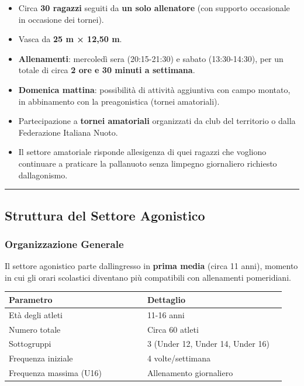 \documentclass[a4paper,11pt]{article}
\providecommand{\tightlist}{%
  \setlength{\itemsep}{0pt}\setlength{\parskip}{0pt}}
\begin{document}
\begin{itemize}
      \tightlist
      \item
            Circa \textbf{30 ragazzi} seguiti da \textbf{un solo allenatore} (con
            supporto occasionale in occasione dei tornei).
      \item
            Vasca da \textbf{25 m × 12,50 m}.
      \item
            \textbf{Allenamenti}: mercoledì sera (20:15-21:30) e sabato
            (13:30-14:30), per un totale di circa \textbf{2 ore e 30 minuti a
                  settimana}.
      \item
            \textbf{Domenica mattina}: possibilità di attività aggiuntiva con
            campo montato, in abbinamento con la preagonistica (tornei
            amatoriali).
      \item
            Partecipazione a \textbf{tornei amatoriali} organizzati da club del
            territorio o dalla Federazione Italiana Nuoto.
      \item
            Il settore amatoriale risponde all\textquotesingle esigenza di quei
            ragazzi che vogliono continuare a praticare la pallanuoto senza
            l\textquotesingle impegno giornaliero richiesto
            dall\textquotesingle agonismo.
\end{itemize}

\begin{center}\rule{0.5\linewidth}{0.5pt}\end{center}

\subsection{Struttura del Settore
      Agonistico}\label{struttura-del-settore-agonistico}

\subsubsection{Organizzazione Generale}\label{organizzazione-generale-1}

Il settore agonistico parte dall\textquotesingle ingresso in
\textbf{prima media} (circa 11 anni), momento in cui gli orari
scolastici diventano più compatibili con allenamenti pomeridiani.

\begin{longtable}[]{@{}p{0.47\linewidth}p{0.47\linewidth}@{}}
      \toprule\noalign{}
      Parametro               & Dettaglio                        \\
      \midrule\noalign{}
      \endhead
      \bottomrule\noalign{}
      \endlastfoot
      Età degli atleti        & 11-16 anni                       \\
      Numero totale           & Circa 60 atleti                  \\
      Sottogruppi             & 3 (Under 12, Under 14, Under 16) \\
      Frequenza iniziale      & 4 volte/settimana                \\
      Frequenza massima (U16) & Allenamento giornaliero          \\
\end{longtable}
\end{document}

